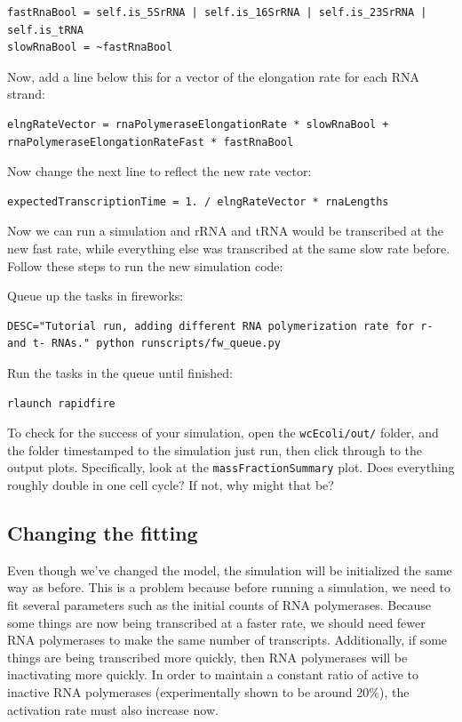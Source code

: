 \documentclass[12pt]{article}
\begin{document}
\begin{lstlisting}
fastRnaBool = self.is_5SrRNA | self.is_16SrRNA | self.is_23SrRNA | self.is_tRNA
slowRnaBool = ~fastRnaBool
\end{lstlisting}

Now, add a line below this for a vector of the elongation rate for each RNA strand:

\begin{lstlisting}
elngRateVector = rnaPolymeraseElongationRate * slowRnaBool +  rnaPolymeraseElongationRateFast * fastRnaBool
\end{lstlisting}

Now change the next line to reflect the new rate vector:

\begin{lstlisting}
expectedTranscriptionTime = 1. / elngRateVector * rnaLengths
\end{lstlisting}

\par
Now we can run a simulation and rRNA and tRNA would be transcribed at the new fast rate, while everything else was transcribed at the same slow rate before. Follow these steps to run the new simulation code:
\par
Queue up the tasks in fireworks:

\lstset{language=bash}
\begin{lstlisting}
DESC="Tutorial run, adding different RNA polymerization rate for r- and t- RNAs." python runscripts/fw_queue.py
\end{lstlisting}

Run the tasks in the queue until finished:

\begin{lstlisting}
rlaunch rapidfire
\end{lstlisting}

To check for the success of your simulation, open the \texttt{wcEcoli/out/} folder, and the folder timestamped to the simulation just run, then click through to the output plots. Specifically, look at the \texttt{massFractionSummary} plot. Does everything roughly double in one cell cycle? If not, why might that be?

\subsection{Changing the fitting}

Even though we've changed the model, the simulation will be initialized the same way as before. This is a problem because before running a simulation, we need to fit several parameters such as the initial counts of RNA polymerases. Because some things are now being transcribed at a faster rate, we should need fewer RNA polymerases to make the same number of transcripts. Additionally, if some things are being transcribed more quickly, then RNA polymerases will be inactivating more quickly. In order to maintain a constant ratio of active to inactive RNA polymerases (experimentally shown to be around 20\%), the activation rate must also increase now. 
\end{document}
